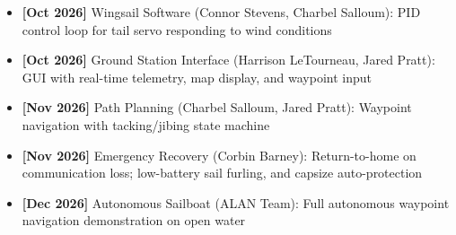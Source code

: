 \begin{itemize}
    \item \textbf{[Oct 2026]} Wingsail Software (Connor Stevens, Charbel Salloum): PID control loop for tail servo responding to wind conditions
    \item \textbf{[Oct 2026]} Ground Station Interface (Harrison LeTourneau, Jared Pratt): GUI with real-time telemetry, map display, and waypoint input
    \item \textbf{[Nov 2026]} Path Planning (Charbel Salloum, Jared Pratt): Waypoint navigation with tacking/jibing state machine
    \item \textbf{[Nov 2026]} Emergency Recovery (Corbin Barney): Return-to-home on communication loss; low-battery sail furling, and capsize auto-protection
    \item \textbf{[Dec 2026]} Autonomous Sailboat (ALAN Team): Full autonomous waypoint navigation demonstration on open water
\end{itemize}

